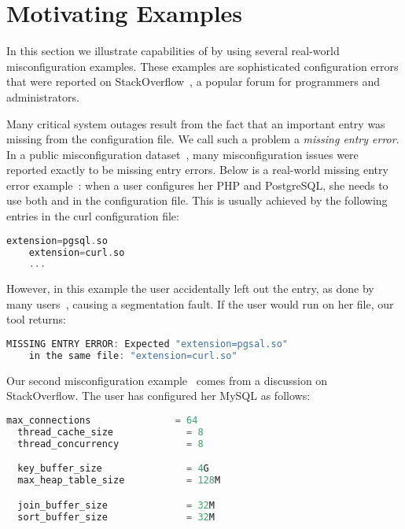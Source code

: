 \section{Motivating Examples}
\label{sec:motiv}

In this section we illustrate capabilities of \app by 
using several real-world misconfiguration examples. 
These examples are sophisticated configuration errors
that were reported on StackOverflow~\cite{stackoverflow},
a popular forum for programmers and administrators. 

Many critical system outages result from the fact that an important
entry was missing from the configuration file. 
We call such a problem a {\em missing entry error}.
In a public misconfiguration 
dataset~\cite{configdataset}, many misconfiguration issues were 
reported exactly to be missing entry errors.
Below is a real-world missing entry error example~\cite{missingentry}:
when a user configures her PHP and PostgreSQL,
she needs to use both  and 
in the  configuration file.
This is usually
achieved by the following entries in 
the curl configuration file:

\begin{lstlisting}[language=C, xleftmargin=.01\textwidth]
    extension=pgsql.so
    extension=curl.so
    ...
\end{lstlisting} 

However, in this example the user accidentally
left out the  entry, 
as done by many users~\cite{yin11anempirical, missingentry}, 
causing a segmentation fault. 
If the user would run \app on her file,
our tool returns:

\begin{lstlisting}[language=C, xleftmargin=.01\textwidth]
    MISSING ENTRY ERROR: Expected "extension=pgsal.so"
    in the same file: "extension=curl.so"
\end{lstlisting} 

\label{ex:fine}
Our second misconfiguration example~\cite{correlation} 
comes from a discussion on StackOverflow.
The user has configured her MySQL as follows:

\begin{lstlisting}[language=C, xleftmargin=.01\textwidth]
  max_connections               = 64
  thread_cache_size             = 8
  thread_concurrency            = 8

  key_buffer_size               = 4G
  max_heap_table_size           = 128M

  join_buffer_size              = 32M
  sort_buffer_size              = 32M    
\end{lstlisting} 

